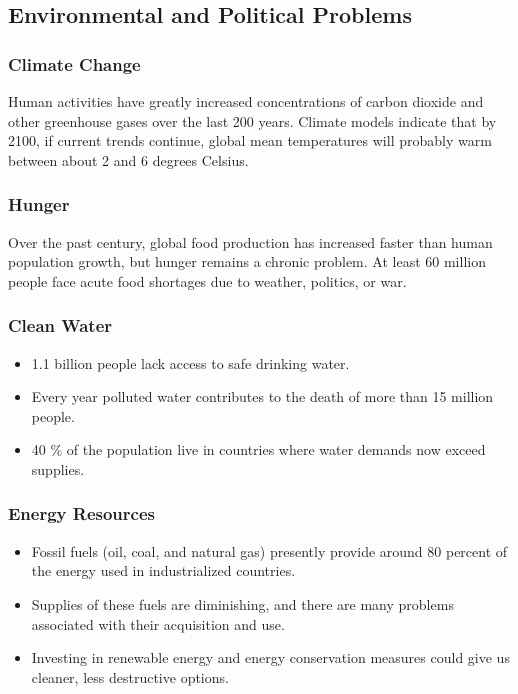 \documentclass[10pt]{article}
\begin{document}
\subsection{Environmental and Political Problems}
\subsubsection{Climate Change} Human activities have greatly increased concentrations of carbon dioxide and other greenhouse gases over the last 200 years. Climate models indicate that by 2100, if current trends continue, global mean temperatures will probably warm between about 2 and 6 degrees Celsius. 

\subsubsection{Hunger} Over the past century, global food production has increased faster than human population growth, but hunger remains a chronic problem. At least 60 million people face acute food shortages due to weather, politics, or war. 

\subsubsection{Clean Water}
\begin{itemize}
    \item 1.1 billion people lack access to safe drinking water.
    \item Every year polluted water contributes to the death of more than 15 million people.
    \item 40 \% of the population live in countries where water demands now exceed supplies. 
\end{itemize}

\subsubsection{Energy Resources}
\begin{itemize}
    \item Fossil fuels (oil, coal, and natural gas) presently provide around 80 percent of the energy used in industrialized countries.
    \item Supplies of these fuels are diminishing, and there are many problems associated with their acquisition and use.
    \item Investing in renewable energy and energy conservation measures could give us cleaner, less destructive options.
\end{itemize}
\end{document}
